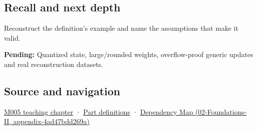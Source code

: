 \subsection{Recall and next depth}\label{appendix-260182e617b7-recall-and-next-depth}

Reconstruct the definition's example and name the assumptions that make it valid.

\textbf{Pending:} Quantized state, large/rounded weights, overflow-proof generic updates and real reconstruction datasets.

\subsection{Source and navigation}\label{appendix-260182e617b7-source-and-navigation}

\hyperref[01-foundations-i-ch001-when-arithmetic-meets-uncertainty]{M005 teaching chapter} · \hyperref[appendix-fd090d982a15-m005---parts-77-88]{Part definitions} · \href{../02-Foundations-II/main.pdf\#nameddest=appendix-4ad47bdd269a}{Dependency Map (02-Foundations-II, appendix-4ad47bdd269a)}

